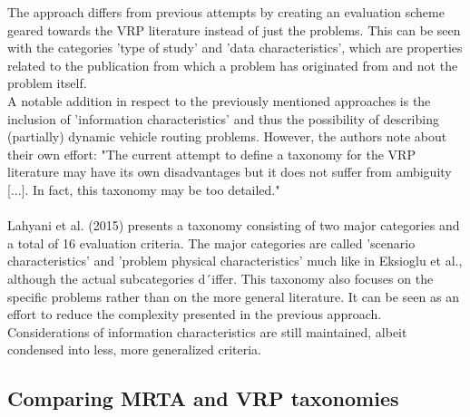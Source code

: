 The approach differs from previous attempts by creating an evaluation scheme geared towards the VRP literature instead of just the problems. This can be seen with the categories 'type of study' and 'data characteristics', which are properties related to the publication from which a problem has originated from and not the problem itself.\\
A notable addition in respect to the previously mentioned approaches is the inclusion of 'information characteristics' and thus the possibility of describing (partially) dynamic vehicle routing problems. However, the authors note about their own effort: "The current attempt to define a taxonomy for the VRP literature may have its own disadvantages but it does not suffer from ambiguity [...]. In fact, this taxonomy may be too detailed." \cite[p.1477]{eksioglu_vehicle_2009}\\ \\
Lahyani et al. (2015) \cite{lahyani_rich_2015} presents a taxonomy consisting of two major categories and a total of 16 evaluation criteria. The major categories are called 'scenario characteristics' and 'problem physical characteristics' much like in Eksioglu et al., although the actual subcategories d´iffer. This taxonomy also focuses on the specific problems rather than on the more general literature. It can be seen as an effort to reduce the complexity presented in the previous approach. Considerations of information characteristics are still maintained, albeit condensed into less, more generalized criteria.

\subsection{Comparing MRTA and VRP taxonomies}\label{sec:problem-comparison}

